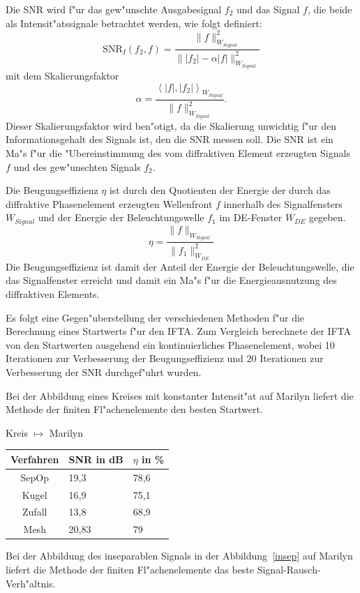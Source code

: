 \documentclass[11pt,a4paper]{article}
\newcommand{\betrag}[1]{|#1|}
\newcommand{\norm}[1]{\parallel #1 \parallel_{W_{Signal}}}
\newcommand{\snr}[2]{\mbox{SNR}_I ( #1, #2 )}
\newcommand{\skalar}[2]{\left< #1, #2 \right>_{W_{Signal}}}
\begin{document}
  Die SNR wird f"ur das gew"unschte Ausgabesignal $f_2$ und das Signal $f$, die beide 
  als Intensit"atssignale betrachtet werden, wie folgt definiert:
  $$ \snr{f_2}{f} = \frac{\norm{f}^2} {\norm{\betrag{f_2}-\alpha\betrag{f}}^2} $$
  mit dem Skalierungsfaktor
  $$ \alpha = \frac{\skalar{\betrag{f}}{\betrag{f_2}}}{\norm{f}^2}. $$
  Dieser Skalierungsfaktor wird ben"otigt, da die Skalierung unwichtig f"ur den 
  Informationsgehalt des Signals ist, den die SNR messen soll. Die SNR ist
  ein Ma"s f"ur die "Ubereinstimmung des vom diffraktiven Element erzeugten Signals $f$
  und des gew"unschten Signals $f_2$.

  Die Beugungseffizienz $\eta$ ist durch den Quotienten der Energie der durch das
  diffraktive Phasenelement erzeugten Wellenfront $f$ innerhalb des 
  Signalfensters $W_{Signal}$ und der Energie der Beleuchtungswelle 
  $f_1$ im DE-Fenster $W_{DE}$ gegeben.
  $$ \eta = \frac{\norm{f}}{\parallel f_1 \parallel_{W_{DE}}^2} $$
  Die Beugungseffizienz ist damit der Anteil der Energie der Beleuchtungswelle, die
  das Signalfenster erreicht und damit ein Ma"s f"ur die Energieausnutzung des 
  diffraktiven Elements. 

  Es folgt eine Gegen"uberstellung der verschiedenen Methoden f"ur die Berechnung
  eines Startwerts f"ur den IFTA. Zum Vergleich berechnete der IFTA von den Startwerten ausgehend ein
  kontinuierliches Phasenelement, wobei 10 Iterationen zur Verbesserung der Beugungseffizienz
  und 20 Iterationen zur Verbesserung der SNR durchgef"uhrt wurden.

  Bei der Abbildung eines Kreises mit konstanter Intensit"at auf Marilyn liefert
  die Methode der finiten Fl"achenelemente den besten Startwert.

  \begin{center}{\large Kreis $\mapsto$ Marilyn} \\
  \begin{tabular}{|c|l|l|}\hline 
    Verfahren   & SNR in dB & $\eta$ in \% \\ \hline\hline
    SepOp	 &  19,3   & 78,6 \\
    Kugel	 &  16,9   & 75,1 \\
    Zufall       &  13,8   & 68,9 \\
    Mesh	 &  20,83  & 79	  \\ \hline 
  \end{tabular}\end{center}

  Bei der Abbildung des inseparablen Signals in der Abbildung~\ref{insep} auf Marilyn liefert
  die Methode der finiten Fl"achenelemente das beste Signal-Rausch-Verh"altnis.
   
\end{document}
